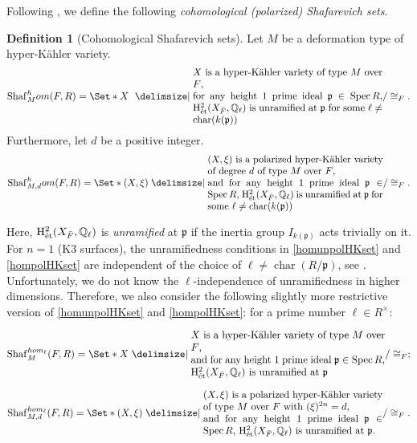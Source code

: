 \documentclass[11pt,reqno,oneside]{amsart}
\numberwithin{equation}{section}
\theoremstyle{definition}
\newtheorem{definition}[theorem]{Definition}
\DeclareMathOperator{\Spec}{Spec}
\DeclareMathOperator{\et}{\Acute{e}t}
\renewcommand{\hom}{{\rm hom}}
\newcommand{\Sha}{\mathrm{Shaf}}
\newcommand\rH{\mathrm{H}}
\newcommand{\QQ}{\mathbb{Q}}
\begin{document}
Following \cite{Takamatsu2020K3}, we define the following \emph{cohomological (polarized) Shafarevich sets}.
\begin{definition}[Cohomological Shafarevich sets]
Let $M$ be a deformation type of hyper-Kähler variety.
\begin{equation}\label{homunpolHKset}
\Sha_{M}^\textrm{hom}(F,R)=\Set*{X~\given \parbox{19em}{
$X$ is a hyper-Kähler variety of type $M$ over $F$, \\
for any height $1$ prime ideal $\mathfrak{p}\in \Spec R$, $\rH^2_{\et}(X_{\bar{F}} , \QQ_\ell)$ is unramified at $\mathfrak{p}$ for some $\ell\neq \operatorname{char}(k(\mathfrak{p}))$}
}/\cong_{F}.
\end{equation}
Furthermore, let $d$ be a positive integer.
\begin{equation}\label{hompolHKset}
\Sha_{M,d}^\textrm{hom}(F,R)=\Set*{ (X,\xi)\given 
\parbox{18em}{
$(X, \xi)$ is a polarized hyper-Kähler variety of degree $d$ of type $M$ over $F$,\\
and for any height $1$ prime ideal $\mathfrak{p}\in \Spec R$, 
 $ \rH^2_{\et}(X_{\bar{F}} , \QQ_\ell)$ is unramified at $\mathfrak{p}$ for some $\ell\neq \operatorname{char}(k(\mathfrak{p}))$}
}/ \cong_{F}.
\end{equation}

Here, $\rH^2_{\et}(X_{\bar{F}} , \QQ_\ell)$ is \textit{unramified} at $\mathfrak{p}$ if the inertia group $I_{k(\mathfrak{p})}$ acts trivially on it. For $n=1$ (K3 surfaces), the unramifiedness conditions in \eqref{homunpolHKset} and \eqref{hompolHKset} are independent of the choice of $\ell\neq \operatorname{char}(R/\mathfrak{p})$, see \cite[Section 5]{Takamatsu2020K3}. Unfortunately, we do not know the $\ell$-independence of unramifiedness in higher dimensions. Therefore, we also consider the following slightly more restrictive version of  \eqref{homunpolHKset} and \eqref{hompolHKset}: for a prime number $\ell\in R^{\times}$:

\begin{equation}\label{homunpolHKset-uniform-l}
\Sha_{M}^{\hom_\ell}(F,R)=\Set*{X \given 
\parbox{19em}{
$X$ is a hyper-Kähler variety of type $M$ over $F$, \\
and for any height $1$ prime ideal $\mathfrak{p}\in \Spec R$,
$\rH^2_{\et}(X_{\bar{F}} , \QQ_\ell)$ is unramified at $\mathfrak{p}$
}}/ \cong_{F};
\end{equation}

\begin{equation}\label{hompolHKset-uniform-l}
\Sha_{M,d}^{\hom_\ell}(F,R)=\Set*{(X,\xi)\given 
\parbox{18em}{$(X,\xi)$ is a polarized hyper-Kähler variety of type $M$ over $F$ with $(\xi)^{2n} =d$,\\ and for any height $1$ prime ideal $\mathfrak{p} \in \Spec R$, $\rH^2_{\et}(X_{\bar{F}},\QQ_{\ell})$ is unramified at $\mathfrak{p}$.}
}/ \cong_{F}.
\end{equation}



\end{definition}
\end{document}
